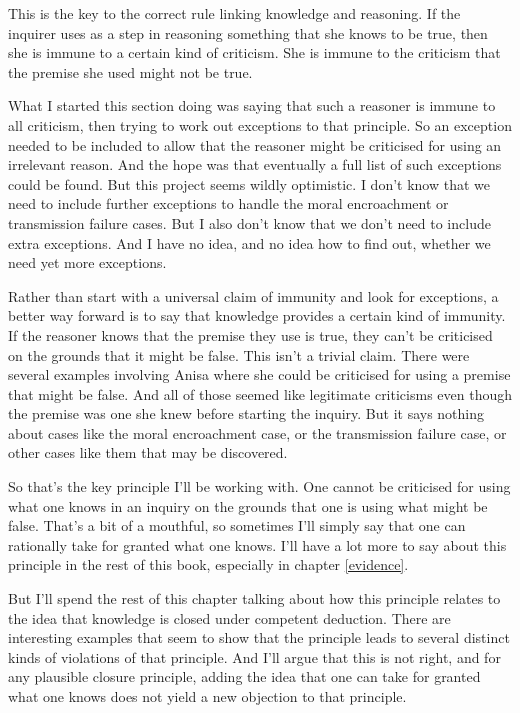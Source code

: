 \documentclass[11pt,]{book}
\begin{document}
This is the key to the correct rule linking knowledge and reasoning. If the inquirer uses as a step in reasoning something that she knows to be true, then she is immune to a certain kind of criticism. She is immune to the criticism that the premise she used might not be true.

What I started this section doing was saying that such a reasoner is immune to all criticism, then trying to work out exceptions to that principle. So an exception needed to be included to allow that the reasoner might be criticised for using an irrelevant reason. And the hope was that eventually a full list of such exceptions could be found. But this project seems wildly optimistic. I don't know that we need to include further exceptions to handle the moral encroachment or transmission failure cases. But I also don't know that we don't need to include extra exceptions. And I have no idea, and no idea how to find out, whether we need yet more exceptions.

Rather than start with a universal claim of immunity and look for exceptions, a better way forward is to say that knowledge provides a certain kind of immunity. If the reasoner knows that the premise they use is true, they can't be criticised on the grounds that it might be false. This isn't a trivial claim. There were several examples involving Anisa where she could be criticised for using a premise that might be false. And all of those seemed like legitimate criticisms even though the premise was one she knew before starting the inquiry. But it says nothing about cases like the moral encroachment case, or the transmission failure case, or other cases like them that may be discovered.

So that's the key principle I'll be working with. One cannot be criticised for using what one knows in an inquiry on the grounds that one is using what might be false. That's a bit of a mouthful, so sometimes I'll simply say that one can rationally take for granted what one knows. I'll have a lot more to say about this principle in the rest of this book, especially in chapter \ref{evidence}.

But I'll spend the rest of this chapter talking about how this principle relates to the idea that knowledge is closed under competent deduction. There are interesting examples that seem to show that the principle leads to several distinct kinds of violations of that principle. And I'll argue that this is not right, and for any plausible closure principle, adding the idea that one can take for granted what one knows does not yield a new objection to that principle.
\end{document}
